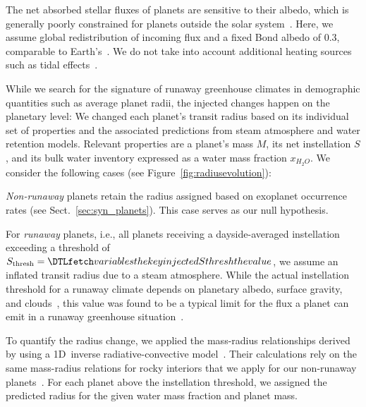 \documentclass[twocolumn,twocolappendix]{aastex631}
\begin{document}
The net absorbed stellar fluxes of planets are sensitive to their albedo, which is generally poorly constrained for planets outside the solar system~\citep[e.g.,][]{Angerhausen2015,Parmentier2018a,Mansfield2019}.
Here, we assume global redistribution of incoming flux and a fixed Bond albedo of $0.3$, comparable to Earth's~\citep{Haar1971}.
We do not take into account additional heating sources such as tidal effects~\citep[e.g.,][]{Barnes2013}.

While we search for the signature of runaway greenhouse climates in demographic quantities such as average planet radii, the injected changes happen on the planetary level: We changed each planet's transit radius based on its individual set of properties and the associated predictions from steam atmosphere and water retention models.
Relevant properties are a planet's mass $M$, its net instellation $S$, and its bulk water inventory expressed as a water mass fraction $x_{H_2O}$.
We consider the following cases (see Figure~\ref{fig:radiusevolution}):

\textit{Non-runaway} planets retain the radius assigned based on exoplanet occurrence rates (see Sect.~\ref{sec:syn_planets}).
This case serves as our null hypothesis.

For \textit{runaway} planets, i.e., all planets receiving a dayside-averaged instellation exceeding a threshold of $S_\mathrm{thresh} = \var{injectedSthresh}$, we assume an inflated transit radius due to a steam atmosphere.
While the actual instellation threshold for a runaway climate depends on planetary albedo, surface gravity, and clouds~\citep{2019Icar..317..583P,Turbet2021,Pierrehumbert2022}, this value was found to be a typical limit for the flux a planet can emit in a runaway greenhouse situation~\citep{Goldblatt2013,Kopparapu2013,Leconte2013,Hamano2015,2017JGRE..122.1458S,2019ApJ...875...31K,Boukrouche2021,2021JGRE..12606711L}.

To quantify the radius change, we applied the mass-radius relationships derived by \citet{Turbet2020} using a 1D~inverse radiative-convective model~\citep{Turbet2019}.
Their calculations rely on the same mass-radius relations for rocky interiors that we apply for our non-runaway planets~\citep{Zeng2016}.
For each planet above the instellation threshold, we assigned the predicted radius for the given water mass fraction and planet mass.
\end{document}
